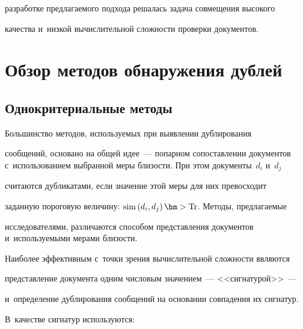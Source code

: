 разработке предлагаемого подхода решалась задача совмещения высокого

качества и~низкой вычислительной сложности проверки документов.



\vspace*{-4pt}



\section{Обзор методов обнаружения дублей}



\vspace*{-4pt}



\subsection{Однокритериальные методы}



\vspace*{-2pt}



  Большинство методов, используемых при выявлении дублирования

сообщений, основано на общей идее~--- попарном сопоставлении документов с~использованием выбранной меры близости. При этом документы~$d_i$ и~$d_j$

считаются дубликатами, если значение этой меры для них превосходит

заданную пороговую величину: $\mathrm{sim}\left(d_i,d_j\right)\hm>\mathrm{Tr}$. Методы, предлагаемые

исследователями, различаются способом представления документов и~используемыми мерами близости.



  Наиболее эффективным с~точки зрения вычислительной сложности являются

представление документа одним числовым значением~---  <<сигнатурой>>~---

и~определение дублирования сообщений на основании совпадения их сигнатур.

В~качестве сигнатур используются:


